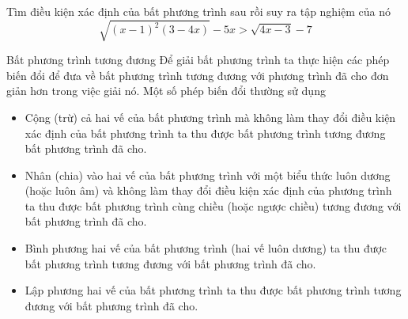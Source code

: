 \begin{bt}%
	Tìm điều kiện xác định của bất phương trình sau rồi suy ra tập nghiệm của nó $$\sqrt{{\left(x-1\right)}^2\left(3-4x\right)}-5x>\sqrt{4x-3}-7$$
\end{bt}
\begin{dang}{Bất phương trình tương đương} 
	Để giải bất phương trình ta thực hiện các phép biến đổi để đưa về bất phương trình tương đương với phương trình đã cho đơn giản hơn trong việc giải nó. Một số phép biến đổi thường sử dụng
	\begin{itemize}
		\item 	Cộng (trừ) cả hai vế của bất phương trình mà không làm thay đổi điều kiện xác định của bất phương trình ta thu được bất phương trình tương đương bất phương trình đã cho.
		\item	Nhân (chia) vào hai vế của bất phương trình với một biểu thức luôn dương (hoặc luôn âm) và không làm thay đổi điều kiện xác định của phương trình ta thu được bất phương trình cùng chiều (hoặc ngược chiều) tương đương với bất phương trình đã cho.
		\item	Bình phương hai vế của bất phương trình (hai vế luôn dương) ta thu được bất phương trình tương đương với bất phương trình đã cho.
		\item	Lập phương hai vế của bất phương trình ta thu được bất phương trình tương đương với bất phương trình đã cho.
	\end{itemize}  
\end{dang}

